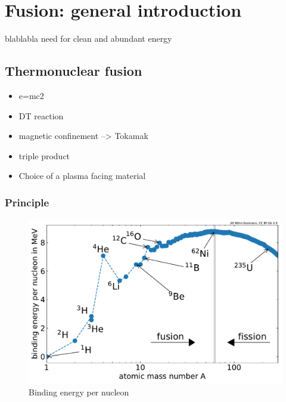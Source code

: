 \setchapterpreamble[u]{\margintoc}
\chapter{Fusion: general introduction}\label{Chapter1}

blablabla need for clean and abundant energy

\section{Thermonuclear fusion}
\begin{itemize}
    \item e=mc2
    \item DT reaction
    \item magnetic confinement --> Tokamak
    \item triple product
    \item Choice of a plasma facing material
\end{itemize}

\subsection{Principle}

\begin{figure} [h]
    \centering
    \includegraphics[width=\linewidth]{Figures/Chapter1/binding_energy_per_nucleon.pdf}
    \caption{Binding energy per nucleon}
\end{figure}

